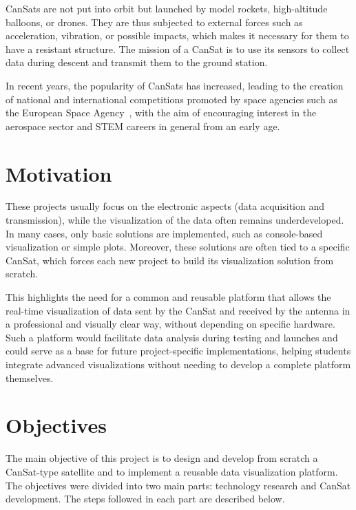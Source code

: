 CanSats are not put into orbit but launched by model rockets, high-altitude balloons, or drones. They are thus subjected to external forces such as acceleration, vibration, or possible impacts, which makes it necessary for them to have a resistant structure.  
The mission of a CanSat is to use its sensors to collect data during descent and transmit them to the ground station.

In recent years, the popularity of CanSats has increased, leading to the creation of national and international competitions promoted by space agencies such as the European Space Agency~\cite{esa_cansat2024}, with the aim of encouraging interest in the aerospace sector and STEM careers in general from an early age.

\section{Motivation}
These projects usually focus on the electronic aspects (data acquisition and transmission), while the visualization of the data often remains underdeveloped.  
In many cases, only basic solutions are implemented, such as console-based visualization or simple plots.  
Moreover, these solutions are often tied to a specific CanSat, which forces each new project to build its visualization solution from scratch.

This highlights the need for a common and reusable platform that allows the real-time visualization of data sent by the CanSat and received by the antenna in a professional and visually clear way, without depending on specific hardware.  
Such a platform would facilitate data analysis during testing and launches and could serve as a base for future project-specific implementations, helping students integrate advanced visualizations without needing to develop a complete platform themselves.

\section{Objectives}
The main objective of this project is to design and develop from scratch a CanSat-type satellite and to implement a reusable data visualization platform.  
The objectives were divided into two main parts: technology research and CanSat development.  
The steps followed in each part are described below.

